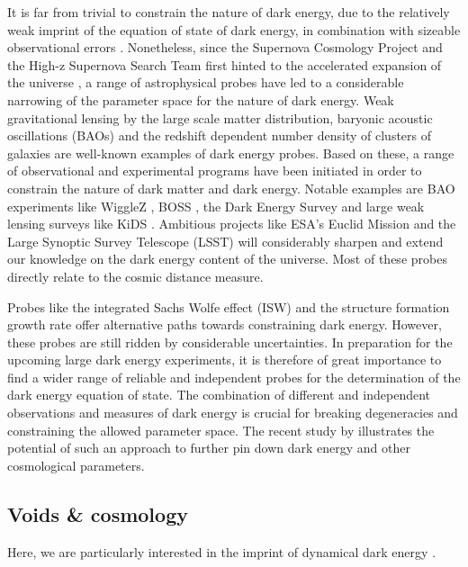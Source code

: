 It is far from trivial to constrain the nature of dark energy, due to the relatively weak imprint of the 
equation of state of dark energy, in combination with sizeable observational errors \citep{frieman08}. Nonetheless, since 
the Supernova Cosmology Project and the High-z Supernova Search Team first hinted to the accelerated expansion of the universe 
\citep{riess98,perlmutter99}, a range of astrophysical probes have led to a considerable narrowing of the parameter space 
for the nature of dark energy. Weak gravitational lensing by the large scale matter distribution, baryonic acoustic oscillations (BAOs) 
and the redshift dependent number density of clusters of galaxies are well-known examples of dark energy probes. Based on these, a 
range of observational and experimental programs have been initiated in order to constrain the nature of dark matter and dark energy. 
Notable examples are BAO experiments like WiggleZ \citep{drinkwater10}, BOSS \citep{ross10}, the 
Dark Energy Survey and large weak lensing surveys like KiDS \citep{dejong12}. Ambitious projects like ESA's 
Euclid Mission \citep{laureijs11} and the Large Synoptic Survey Telescope (LSST) will considerably sharpen and extend our knowledge on the 
dark energy content of the universe. Most of these probes directly relate to the cosmic distance measure.

Probes like the integrated Sachs Wolfe effect (ISW) \citep{dupe11} and the structure formation growth rate \citep{linder06,guzzo08}
offer alternative paths towards constraining dark energy. However, these probes are still ridden by considerable uncertainties. 
In preparation for the upcoming large dark energy experiments, it is therefore of great importance to find a wider range of 
reliable and independent probes for the determination of the dark energy equation of state. The combination of different and 
independent observations and measures of dark energy is crucial for breaking degeneracies and constraining the allowed parameter space. 
The recent study by \citet{amanullah10} illustrates the potential of such an approach to further pin down dark energy and other 
cosmological parameters.

\subsection{Voids \& cosmology}
\label{sec:voidscosmo}
Here, we are particularly interested in the imprint of dynamical dark energy \citep{wetterich88}.

